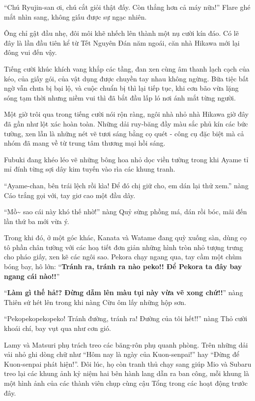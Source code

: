 \documentclass[../main.tex]{subfiles}
\begin{document}
``Chú Ryujin-san ơi, chú cắt giỏi thật đấy. Còn thẳng hơn cả máy nữa!'' Flare ghé mắt nhìn sang, không giấu được sự ngạc nhiên.

Ông chỉ gật đầu nhẹ, đôi môi khẽ nhếch lên thành một nụ cười kín đáo. Có lẽ đây là lần đầu tiên kể từ Tết Nguyên Đán năm ngoái, căn nhà Hikawa mới lại đông vui đến vậy.

Tiếng cười khúc khích vang khắp các tầng, đan xen cùng âm thanh lạch cạch của kéo, của giấy gói, của vật dụng được chuyền tay nhau không ngừng. Bữa tiệc bất ngờ vẫn chưa bị bại lộ, và cuộc chuẩn bị thì lại tiếp tục, khi cơn bão vừa lặng sóng tạm thời nhưng niềm vui thì đã bắt đầu lấp ló nơi ánh mắt từng người.

\ct

Một giờ trôi qua trong tiếng cười nói rộn ràng, ngôi nhà nhỏ nhà Hikawa giờ đây đã gần như lột xác hoàn toàn. Những dải ruy-băng đầy màu sắc phủ kín các bức tường, xen lẫn là những nét vẽ tươi sáng bằng cọ quét - công cụ đặc biệt mà cả nhóm đã mang về từ trung tâm thương mại hồi sáng.

Fubuki đang khéo léo vẽ những bông hoa nhỏ dọc viền tường trong khi Ayame tỉ mỉ đính từng sợi dây kim tuyến vào rìa các khung tranh.

``Ayame-chan, bên trái lệch rồi kìa! Để đó chị giữ cho, em dán lại thử xem.'' nàng Cáo trắng gọi với, tay giơ cao một đầu dây.

``Mồ\~{} sao cái này khó thế nhờ!'' nàng Quỷ sừng phồng má, dán rồi bóc, mãi đến lần thứ ba mới vừa ý.

Trong khi đó, ở một góc khác, Kanata và Watame đang quỳ xuống sàn, dùng cọ tô phần chân tường với các hoạ tiết đơn giản những hình tròn nhỏ tượng trưng cho pháo giấy, xen kẽ các ngôi sao. Pekora chạy ngang qua, tay cầm một chùm bóng bay, hô lớn: ``\textbf{Tránh ra, tránh ra nào peko!! Để Pekora ta đây bay ngang cái nào!!}''

``\textbf{Làm gì thế hả!? Đừng dẫm lên màu tụi này vừa vẽ xong chứ!!}'' nàng Thiên sứ hét lên trong khi nàng Cừu ôm lấy những hộp sơn.

``Peko\uparrow peko\downarrow peko\uparrow peko\downarrow! Tránh đường, tránh ra! Đường của tôi hết!!'' nàng Thỏ cười khoái chí, bay vụt qua như cơn gió.

Lamy và Matsuri phụ trách treo các băng-rôn phụ quanh phòng. Trên những dải vải nhỏ ghi dòng chữ như ``Hôm nay là ngày của Kuon-senpai!'' hay ``Đừng để Kuon-senpai phát hiện!''. Đôi lúc, họ còn tranh thủ chạy sang giúp Mio và Subaru treo lại các khung ảnh kỷ niệm hai bên hành lang dẫn ra ban công, mỗi khung là một hình ảnh của các thành viên chụp cùng cậu Tổng trong các hoạt động trước đây.
\end{document}
